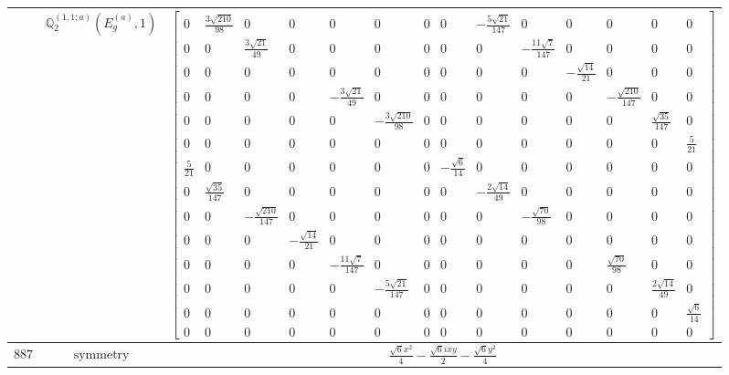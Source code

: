 \documentclass[fleqn,8pt,landscape]{jsarticle}
\begin{document}
\begin{longtable}{ccc}
$  $ & $ \mathbb{Q}_{2}^{(1,1;a)}(E_{g}^{(a)},1) $ & $ \begin{bmatrix} 0 & \frac{3 \sqrt{210}}{98} & 0 & 0 & 0 & 0 & 0 & 0 & - \frac{5 \sqrt{21}}{147} & 0 & 0 & 0 & 0 & 0 \\ 0 & 0 & \frac{3 \sqrt{21}}{49} & 0 & 0 & 0 & 0 & 0 & 0 & - \frac{11 \sqrt{7}}{147} & 0 & 0 & 0 & 0 \\ 0 & 0 & 0 & 0 & 0 & 0 & 0 & 0 & 0 & 0 & - \frac{\sqrt{14}}{21} & 0 & 0 & 0 \\ 0 & 0 & 0 & 0 & - \frac{3 \sqrt{21}}{49} & 0 & 0 & 0 & 0 & 0 & 0 & - \frac{\sqrt{210}}{147} & 0 & 0 \\ 0 & 0 & 0 & 0 & 0 & - \frac{3 \sqrt{210}}{98} & 0 & 0 & 0 & 0 & 0 & 0 & \frac{\sqrt{35}}{147} & 0 \\ 0 & 0 & 0 & 0 & 0 & 0 & 0 & 0 & 0 & 0 & 0 & 0 & 0 & \frac{5}{21} \\ \frac{5}{21} & 0 & 0 & 0 & 0 & 0 & 0 & - \frac{\sqrt{6}}{14} & 0 & 0 & 0 & 0 & 0 & 0 \\ 0 & \frac{\sqrt{35}}{147} & 0 & 0 & 0 & 0 & 0 & 0 & - \frac{2 \sqrt{14}}{49} & 0 & 0 & 0 & 0 & 0 \\ 0 & 0 & - \frac{\sqrt{210}}{147} & 0 & 0 & 0 & 0 & 0 & 0 & - \frac{\sqrt{70}}{98} & 0 & 0 & 0 & 0 \\ 0 & 0 & 0 & - \frac{\sqrt{14}}{21} & 0 & 0 & 0 & 0 & 0 & 0 & 0 & 0 & 0 & 0 \\ 0 & 0 & 0 & 0 & - \frac{11 \sqrt{7}}{147} & 0 & 0 & 0 & 0 & 0 & 0 & \frac{\sqrt{70}}{98} & 0 & 0 \\ 0 & 0 & 0 & 0 & 0 & - \frac{5 \sqrt{21}}{147} & 0 & 0 & 0 & 0 & 0 & 0 & \frac{2 \sqrt{14}}{49} & 0 \\ 0 & 0 & 0 & 0 & 0 & 0 & 0 & 0 & 0 & 0 & 0 & 0 & 0 & \frac{\sqrt{6}}{14} \\ 0 & 0 & 0 & 0 & 0 & 0 & 0 & 0 & 0 & 0 & 0 & 0 & 0 & 0 \end{bmatrix} $ \\ \hline
$ 887 $ & $ \text{symmetry} $ & $ \frac{\sqrt{6} x^{2}}{4} - \frac{\sqrt{6} i x y}{2} - \frac{\sqrt{6} y^{2}}{4} $ \\

\end{longtable}
\end{document}
